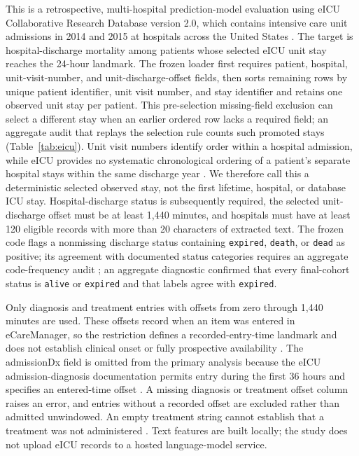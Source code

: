 \documentclass[11pt]{article}
\begin{document}
This is a retrospective, multi-hospital prediction-model evaluation using eICU Collaborative Research Database version 2.0, which contains intensive care unit admissions in 2014 and 2015 at hospitals across the United States \cite{r1,r2}. The target is hospital-discharge mortality among patients whose selected eICU unit stay reaches the 24-hour landmark. The frozen loader first requires patient, hospital, unit-visit-number, and unit-discharge-offset fields, then sorts remaining rows by unique patient identifier, unit visit number, and stay identifier and retains one observed unit stay per patient. This pre-selection missing-field exclusion can select a different stay when an earlier ordered row lacks a required field; an aggregate audit that replays the selection rule counts such promoted stays (Table~\ref{tab:eicu}). Unit visit numbers identify order within a hospital admission, while eICU provides no systematic chronological ordering of a patient's separate hospital stays within the same discharge year \cite{r11}. We therefore call this a deterministic selected observed stay, not the first lifetime, hospital, or database ICU stay. Hospital-discharge status is subsequently required, the selected unit-discharge offset must be at least 1,440 minutes, and hospitals must have at least 120 eligible records with more than 20 characters of extracted text. The frozen code flags a nonmissing discharge status containing \texttt{expired}, \texttt{death}, or \texttt{dead} as positive; its agreement with documented status categories requires an aggregate code-frequency audit \cite{r11}; an aggregate diagnostic confirmed that every final-cohort status is \texttt{alive} or \texttt{expired} and that labels agree with \texttt{expired}.

Only diagnosis and treatment entries with offsets from zero through 1,440 minutes are used. These offsets record when an item was entered in eCareManager, so the restriction defines a recorded-entry-time landmark and does not establish clinical onset or fully prospective availability \cite{r13,r14}. The admissionDx field is omitted from the primary analysis because the eICU admission-diagnosis documentation permits entry during the first 36 hours and specifies an entered-time offset \cite{r12}. A missing diagnosis or treatment offset column raises an error, and entries without a recorded offset are excluded rather than admitted unwindowed. An empty treatment string cannot establish that a treatment was not administered \cite{r14}. Text features are built locally; the study does not upload eICU records to a hosted language-model service.
\end{document}
